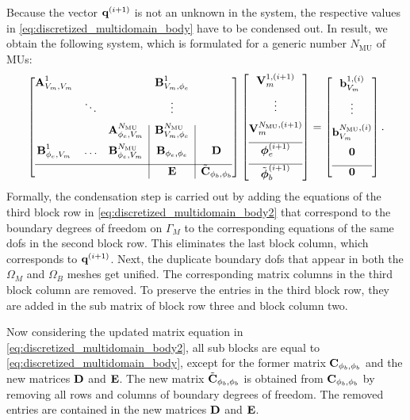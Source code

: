 Because the vector $\textbf{q}^{(i+1)}$ is not an unknown in the system, the respective values in \cref{eq:discretized_multidomain_body} have to be condensed out.
In result, we obtain the following system, which is formulated for a generic number $N_\text{MU}$ of MUs:
%
\begin{align}\label{eq:discretized_multidomain_body2}
  \left[\begin{array}{@{}ccc|c|c@{}}
    \bfA_{V_m,V_m}^1 &&& \bfB_{V_m,\phi_e}^1 &\\[2mm]
    &\ddots&&\vdots&\\[2mm]
    &&\bfA_{\phi_e,V_m}^{N_\text{MU}} & \bfB_{V_m,\phi_e}^{N_\text{MU}}&\\[2mm]
    \bfB_{\phi_e,V_m}^1 & \dots & \bfB_{\phi_e,V_m}^{N_\text{MU}} & \bfB_{\phi_e,\phi_e} & \bfD \\[2mm] \hline
    &&&\bfE & \tilde{\bfC}_{\phi_b,\phi_b}
  \end{array}\right]
  \left[\begin{array}{@{}c@{}}
    \bfV_{m}^{1,(i+1)}  \\[2mm]
    \vdots\\[2mm]
    \bfV_{m}^{N_\text{MU},(i+1)}\\[2mm]\hline 
    \bfphi_{e}^{(i+1)} \\[2mm]\hline
    \tilde{\bfphi}_{b}^{(i+1)}
  \end{array}\right]
  = 
  \left[\begin{array}{@{}c@{}}
    \bfb_{V_m}^{1,(i)} \\[2mm]
    \vdots \\[2mm]
    \bfb_{V_m}^{N_\text{MU},(i)}\\[2mm]
    \bfzero\\[2mm]\hline
    \bfzero
  \end{array}\right].
\end{align}
%
Formally, the condensation step is carried out by adding the equations of the third block row in \cref{eq:discretized_multidomain_body2} that correspond to the boundary degrees of freedom on $\Gamma_M$ to the corresponding equations of the same dofs in the second block row. This eliminates the last block column, which corresponds to $\textbf{q}^{(i+1)}$. Next, the duplicate boundary dofs that appear in both the $\Omega_M$ and $\Omega_B$ meshes get unified. The corresponding matrix columns in the third block column are removed. To preserve the entries in the third block row, they are added in the sub matrix of block row three and block column two.

Now considering the updated matrix equation in \cref{eq:discretized_multidomain_body2}, all sub blocks are equal to \cref{eq:discretized_multidomain_body}, except for the former matrix $\textbf{C}_{\phi_b,\phi_b}$ and the new matrices $\textbf{D}$ and $\textbf{E}$. The new matrix $\tilde{\textbf{C}}_{\phi_b,\phi_b}$ is obtained from $\textbf{C}_{\phi_b,\phi_b}$ by removing all rows and columns of boundary degrees of freedom. The removed entries are contained in the new matrices $\textbf{D}$ and $\textbf{E}$.

